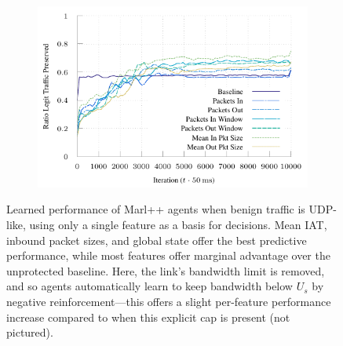 \documentclass[conference, letterpaper, 10pt, times]{IEEEtran}
\begin{document}
\begin{figure}
\begin{subfigure}{0.32\linewidth}
	\end{subfigure}
	\begin{subfigure}{0.32\linewidth}
		\includegraphics[width=\linewidth]{../plots/ftprep-good-3}
	\end{subfigure}
	\caption{
		Learned performance of Marl++ agents when benign traffic is UDP-like, using only a single feature as a basis for decisions.
		Mean IAT, inbound packet sizes, and global state offer the best predictive performance, while most features offer marginal advantage over the unprotected baseline.
		Here, the link's bandwidth limit is removed, and so agents automatically learn to keep bandwidth below $U_s$ by negative reinforcement---this offers a slight per-feature performance increase compared to when this explicit cap is present (not pictured).
		\label{fig:udp-feature-plots}
	}
\end{figure}

\end{document}
